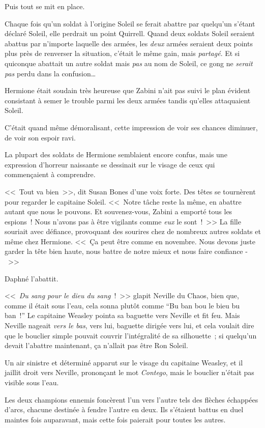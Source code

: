 Puis tout se mit en place.

Chaque fois qu'un soldat à l'origine Soleil se ferait abattre par quelqu'un s'étant déclaré Soleil, elle perdrait un point Quirrell. Quand deux soldats Soleil seraient abattus par n'importe laquelle des armées, les \emph{deux} armées seraient deux points plus près de renverser la situation, c'était le même gain, mais \emph{partagé}. Et si quiconque abattait un autre soldat mais \emph{pas} au nom de Soleil, ce gong ne \emph{serait pas} perdu dans la confusion…

Hermione était soudain très heureuse que Zabini n'ait pas suivi le plan évident consistant à semer le trouble parmi les deux armées tandis qu'elles attaquaient Soleil.

C'était quand même démoralisant, cette impression de voir ses chances diminuer, de voir son espoir ravi.

La plupart des soldats de Hermione semblaient encore confus, mais une expression d'horreur naissante se dessinait sur le visage de ceux qui commençaient à comprendre.

<<~Tout va bien~>>, dit Susan Bones d'une voix forte. Des têtes se tournèrent pour regarder le capitaine Soleil. <<~Notre tâche reste la même, en abattre autant que nous le pouvons. Et souvenez-vous, Zabini a emporté tous les espions~! Nous n'avons pas à être vigilants comme \emph{eux} le sont~!~>> La fille souriait avec défiance, provoquant des sourires chez de nombreux autres soldats et même chez Hermione. <<~Ça peut être comme en novembre. Nous devons juste garder la tête bien haute, nous battre de notre mieux et nous faire confiance -~>>

Daphné l'abattit.

\later

<<~\emph{Du sang pour le dieu du sang}~!~>> glapit Neville du Chaos, bien que, comme il était sous l'eau, cela sonna plutôt comme “Bu ban bou le bieu bu ban~!”
Le capitaine Weasley pointa sa baguette vers Neville et fit feu. Mais Neville nageait \emph{vers le bas}, vers lui, baguette dirigée vers lui, et cela voulait dire que le bouclier simple pouvait couvrir l'intégralité de sa silhouette~; si quelqu'un devait l'abattre maintenant, ça n'allait pas être Ron Soleil.

Un air sinistre et déterminé apparut sur le visage du capitaine Weasley, et il jaillit droit vers Neville, prononçant le mot \emph{Contego}, mais le bouclier n'était pas visible sous l'eau.

Les deux champions ennemis foncèrent l'un vers l'autre tels des flèches échappées d'arcs, chacune destinée à fendre l'autre en deux. Ils s'étaient battus en duel maintes fois auparavant, mais cette fois paierait pour toutes les autres.

